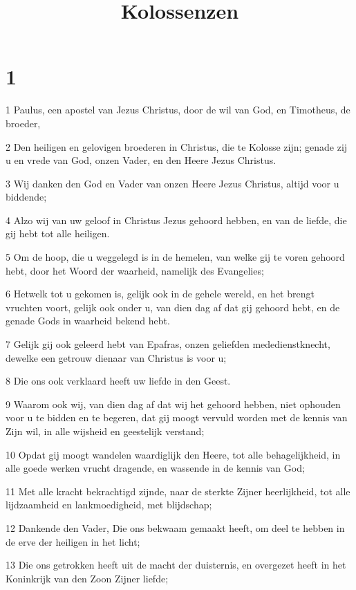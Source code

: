 

\title{Kolossenzen}



\chapter{1}

\par 1 Paulus, een apostel van Jezus Christus, door de wil van God, en Timotheus, de broeder,
\par 2 Den heiligen en gelovigen broederen in Christus, die te Kolosse zijn; genade zij u en vrede van God, onzen Vader, en den Heere Jezus Christus.
\par 3 Wij danken den God en Vader van onzen Heere Jezus Christus, altijd voor u biddende;
\par 4 Alzo wij van uw geloof in Christus Jezus gehoord hebben, en van de liefde, die gij hebt tot alle heiligen.
\par 5 Om de hoop, die u weggelegd is in de hemelen, van welke gij te voren gehoord hebt, door het Woord der waarheid, namelijk des Evangelies;
\par 6 Hetwelk tot u gekomen is, gelijk ook in de gehele wereld, en het brengt vruchten voort, gelijk ook onder u, van dien dag af dat gij gehoord hebt, en de genade Gods in waarheid bekend hebt.
\par 7 Gelijk gij ook geleerd hebt van Epafras, onzen geliefden mededienstknecht, dewelke een getrouw dienaar van Christus is voor u;
\par 8 Die ons ook verklaard heeft uw liefde in den Geest.
\par 9 Waarom ook wij, van dien dag af dat wij het gehoord hebben, niet ophouden voor u te bidden en te begeren, dat gij moogt vervuld worden met de kennis van Zijn wil, in alle wijsheid en geestelijk verstand;
\par 10 Opdat gij moogt wandelen waardiglijk den Heere, tot alle behagelijkheid, in alle goede werken vrucht dragende, en wassende in de kennis van God;
\par 11 Met alle kracht bekrachtigd zijnde, naar de sterkte Zijner heerlijkheid, tot alle lijdzaamheid en lankmoedigheid, met blijdschap;
\par 12 Dankende den Vader, Die ons bekwaam gemaakt heeft, om deel te hebben in de erve der heiligen in het licht;
\par 13 Die ons getrokken heeft uit de macht der duisternis, en overgezet heeft in het Koninkrijk van den Zoon Zijner liefde;
